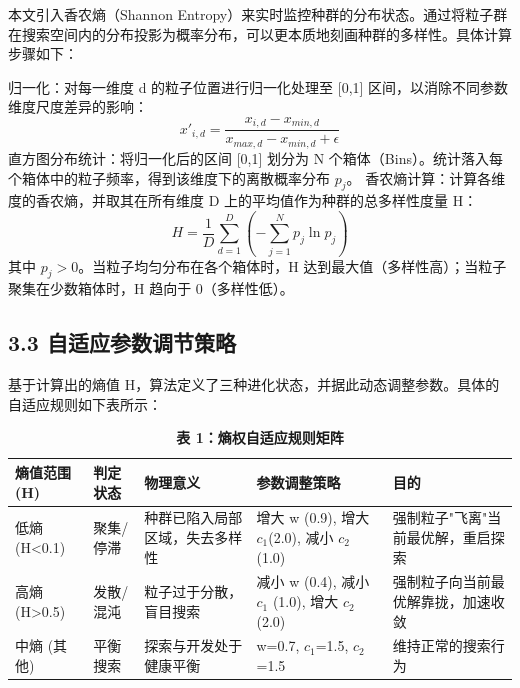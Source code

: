 \documentclass[twocolumn, 12pt]{article} %
\newcommand{\wuhao}{\fontsize{10.5pt}{12.6pt}\selectfont} %
\begin{document}
	本文引入香农熵（Shannon Entropy）来实时监控种群的分布状态。通过将粒子群在搜索空间内的分布投影为概率分布，可以更本质地刻画种群的多样性。具体计算步骤如下：
	
	归一化：对每一维度 d 的粒子位置进行归一化处理至 [0,1] 区间，以消除不同参数维度尺度差异的影响：
	\begin{equation}
		x'_{i,d} = \frac{x_{i,d} - x_{min,d}}{x_{max,d} - x_{min,d} + \epsilon}
	\end{equation}
	直方图分布统计：将归一化后的区间 [0,1] 划分为 N 个箱体（Bins）。统计落入每个箱体中的粒子频率，得到该维度下的离散概率分布 $p_j$。
	香农熵计算：计算各维度的香农熵，并取其在所有维度 D 上的平均值作为种群的总多样性度量 H：
	\begin{equation}
		H = \frac{1}{D} \sum_{d=1}^{D} \left( -\sum_{j=1}^{N} p_j \ln p_j \right)
	\end{equation}
	其中 $p_j > 0$。当粒子均匀分布在各个箱体时，H 达到最大值（多样性高）；当粒子聚集在少数箱体时，H 趋向于 0（多样性低）。
	
	\subsection{3.3 自适应参数调节策略}
	基于计算出的熵值 H，算法定义了三种进化状态，并据此动态调整参数。具体的自适应规则如下表所示：
	
	\begin{table}[ht]
		\centering
		\caption{\textbf{表 1：熵权自适应规则矩阵}}
		\wuhao
		\begin{tabular}{p{2cm}p{2cm}p{3.5cm}p{4cm}p{3cm}}
			\toprule
			熵值范围 (H) & 判定状态 & 物理意义 & 参数调整策略 & 目的 \\
			\midrule
			低熵 (H<0.1) & 聚集/停滞 & 种群已陷入局部区域，失去多样性 & 增大 w (0.9), 增大 $c_1$(2.0), 减小 $c_2$ (1.0) & 强制粒子"飞离"当前最优解，重启探索 \\
			高熵 (H>0.5) & 发散/混沌 & 粒子过于分散，盲目搜索 & 减小 w (0.4), 减小 $c_1$ (1.0), 增大 $c_2$ (2.0) & 强制粒子向当前最优解靠拢，加速收敛 \\
			中熵 (其他) & 平衡搜索 & 探索与开发处于健康平衡 & w=0.7, $c_1$=1.5, $c_2$=1.5 & 维持正常的搜索行为 \\
			\bottomrule
		\end{tabular}
	\end{table}
	
\end{document}

